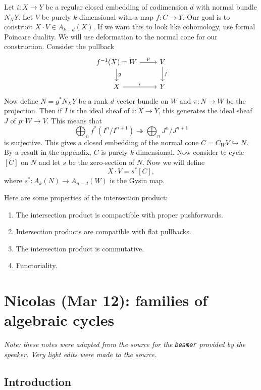 \documentclass[leqno, openany]{memoir}
\theoremstyle{definition}
\theoremstyle{remark}
\theoremstyle{plain}
\theoremstyle{definition}
\theoremstyle{remark}
\begin{document}
Let $i \colon X \to Y$ be a regular closed embedding of codimension $d$ with normal bundle $N_X Y$. Let $V$ be purely $k$-dimensional with a map $f \colon C \to Y$. Our goal is to construct $X \cdot V \in A_{k-d}(X)$. If we want this to look like cohomology, use formal Poincare duality. We will use deformation to the normal cone for our construction. Consider the pullback 
\begin{equation*}
\begin{tikzcd}
    f^{-1}(X) = W \ar{d}{g} \ar{r}{p} & V \ar{d}{f} \\
    X \ar{r}{i} & Y
\end{tikzcd}
\end{equation*}
Now define $N = g^* N_X Y$ be a rank $d$ vector bundle on $W$ and $\pi \colon N \to W$ be the projection. Then if $I$ is the ideal sheaf of $i \colon X \to Y$, this generates the ideal sheaf $J$ of $p \colon W \to V$. This means that
\[ \bigoplus_n f^* (I^n / I^{n+1}) \twoheadrightarrow \bigoplus_n J^n / J^{n+1} \]
is surjective. This gives a closed embedding of the normal cone $C = C_W V \hookrightarrow N$. By a result in the appendix, $C$ is purely $k$-dimensional. Now consider te cycle $[C]$ on $N$ and let $s$ be the zero-section of $N$. Now we will define 
\[ X \cdot V = s^* [C], \]
where $s^* \colon A_k (N) \to A_{n-d}(W)$ is the Gysin map.

Here are some properties of the intersection product:
\begin{enumerate}
    \item The intersection product is compactible with proper pushforwards.
    \item Intersection products are compatible with flat pullbacks.
    \item The intersection product is commutative.
    \item Functoriality.
\end{enumerate}

\chapter{Nicolas (Mar 12): families of algebraic cycles}%
\label{cha:nicolas_mar_12_families_of_algebraic_cycles}

\textit{Note: these notes were adapted from the source for the \texttt{beamer} provided by the speaker. Very light edits were made to the source.} 

\section{Introduction}
\end{document}
